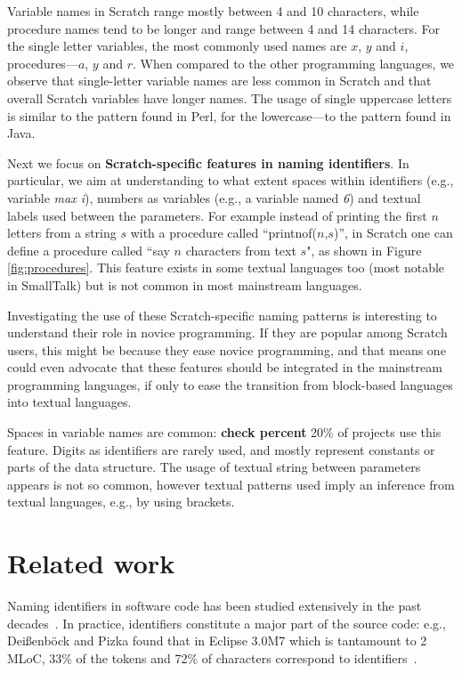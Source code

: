 \documentclass[conference]{IEEEtran}
\newcommand{\todo}[1]{ \textbf{#1} }
\begin{document}
\begin{framed}
Variable names in Scratch range mostly between 4 and 10 characters, while procedure names tend to be longer and range between 4 and 14 characters. 
For the single letter variables, the most commonly used names are $x$, $y$ and $i$, procedures---$a$, $y$ and $r$. 
When compared to the other programming languages, we observe that single-letter variable names are less common in Scratch and that overall Scratch variables have longer names. 
The usage of single uppercase letters is similar to the pattern found in Perl, for the lowercase---to the pattern found in Java.
\end{framed}


Next we focus on \textbf{Scratch-specific features in naming identifiers}.
In particular, we aim at understanding to what extent spaces within identifiers (e.g., variable \emph{max i}), numbers as variables (e.g., a variable named \emph{6}) and textual labels used between the parameters. 
For example instead of printing the first $n$ letters from a string $s$ with a procedure called ``printnof($n$,$s$)'', in Scratch one can define a procedure called ``say $n$ characters from text $s$", as shown in Figure \ref{fig:procedures}. 
This feature exists in some textual languages too (most notable in SmallTalk) but is not common in most mainstream languages. 

Investigating the use of these Scratch-specific naming patterns is interesting to understand their role in novice programming. If they are popular among Scratch users, this might be because they ease novice programming, and that means one could even advocate that these features should be integrated in the mainstream programming languages, if only to ease the transition from block-based languages into textual languages.

\begin{framed}
 Spaces in variable names are common: \todo{check percent} 20\% of projects use this feature. 
 Digits as identifiers are rarely used, and mostly represent constants or parts of the data structure.
 The usage of textual string between parameters appears is not so common, however textual patterns used imply an inference from textual languages, e.g., by using brackets. 
\end{framed}

\section{Related work}
Naming identifiers in software code has been studied extensively in the past decades~\cite{AmanASK15,AnquetilL98,AvidanF17,Beniamini,ButlerWYS10,CaprileT00,HofmeisterSH17,LawrieMFB07,LunguK13,ScannielloR13,TakangGM96,Teasley,TramontanaRS14}. 
In practice, identifiers constitute a major part of the source code: e.g., Dei{\ss}enb{\"o}ck and Pizka found that in Eclipse 3.0M7 which is tantamount to 2 MLoC, 33\% of the tokens and 72\% of characters correspond to identifiers~\cite{Deissenbock}. 
\end{document}
